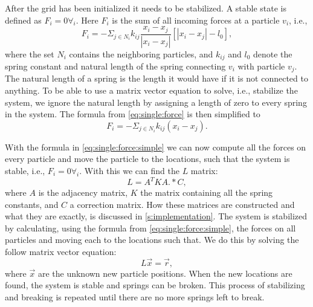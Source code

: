 After the grid has been initialized it needs to be stabilized. A stable state is defined as $F_i = 0 \forall_i$. Here $F_i$ is the sum of all incoming forces at a particle $v_i$, i.e.,
%
\begin{equation}\label{eq:single:force}
	F_i = - \Sigma_{j \in N_i} k_{ij} \frac{x_i - x_j}{|x_i - x_j|}[|x_i - x_j| - l_0],
\end{equation}
%
where the set $N_i$ contains the neighboring particles, and $k_{ij}$ and $l_0$ denote the spring constant and natural length of the spring connecting $v_i$ with 
particle $v_j$. The natural length of a spring is the length it would have if it is not connected to anything. To be able to use a matrix vector equation to solve, i.e., stabilize the system, we ignore the natural length by assigning a length of zero to every spring in the system. The formula from \eqref{eq:single:force} is then simplified to 
%
\begin{equation}\label{eq:single:force:simple}
	F_i = - \Sigma_{j \in N_i} k_{ij}(x_i - x_j).
\end{equation}

With the formula in \cref{eq:single:force:simple} we can now compute all the forces on every particle and move the particle to the locations, such that the system is stable, i.e., $F_i = 0 \forall_i$. With this we can find the $L$ matrix:
%
\begin{equation}\label{eq:method:stabilizationEquationLHS}
	L = A^T K A .* C,
\end{equation}
%
where $A$ is the adjacency matrix, $K$ the matrix containing all the spring constants, and $C$ a correction matrix. How these matrices are constructed and what they are exactly, is discussed in \cref{s:implementation}. The system is stabilized by calculating, using the formula from \eqref{eq:single:force:simple}, the forces on all particles and moving each to the locations such that. We do this by solving the follow matrix vector equation:
%
\begin{equation}\label{eq:method:stabilizationEquation}
	L\vec{x} = \vec{r},
\end{equation}
%
where $\vec{x}$ are the unknown new particle positions. When the new locations are found, the system is stable and springs can be broken. This process of stabilizing and breaking is repeated until there are no more springs left to break. 

